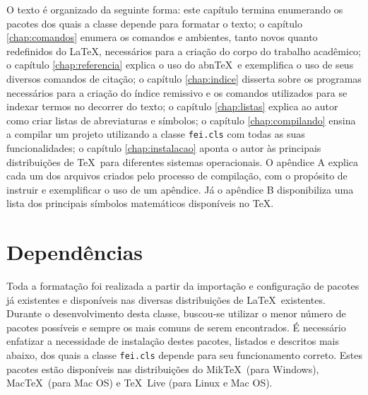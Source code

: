 \documentclass[xindy,rascunho]{fei}
\begin{document}
O texto é organizado da seguinte forma: este capítulo termina enumerando os pacotes dos quais a classe depende para formatar o texto; o capítulo \ref{chap:comandos} enumera os comandos e ambientes, tanto novos quanto redefinidos do \LaTeX, necessários para a criação do corpo do trabalho acadêmico; o capítulo \ref{chap:referencia} explica o uso do abn\TeX\ e exemplifica o uso de seus diversos comandos de citação; o capítulo \ref{chap:indice} disserta sobre os programas necessários para a criação do índice remissivo e os comandos utilizados para se indexar termos no decorrer do texto; o capítulo \ref{chap:listas} explica ao autor como criar listas de abreviaturas e símbolos; o capítulo \ref{chap:compilando} ensina a compilar um projeto utilizando a classe \texttt{fei.cls} com todas as suas funcionalidades; o capítulo \ref{chap:instalacao} aponta o autor às principais distribuições de \TeX\ para diferentes sistemas operacionais. O apêndice A explica cada um dos arquivos criados pelo processo de compilação, com o propósito de instruir e exemplificar o uso de um apêndice. Já o apêndice B disponibiliza uma lista dos principais símbolos matemáticos disponíveis no \TeX.

\section{Dependências}\label{sec:dependencias}

Toda a formatação foi realizada a partir da importação e configuração de pacotes já existentes e disponíveis nas diversas distribuições de \LaTeX\ existentes. Durante o desenvolvimento desta classe, buscou-se utilizar o menor número de pacotes possíveis e sempre os mais comuns de serem encontrados. É necessário enfatizar a necessidade de instalação destes pacotes, listados e descritos mais abaixo, dos quais a classe \texttt{fei.cls} depende para seu funcionamento correto. Estes pacotes estão disponíveis nas distribuições do Mik\TeX\ (para Windows), Mac\TeX\ (para Mac OS) e \TeX\ Live (para Linux e Mac OS).
    
\end{document}
